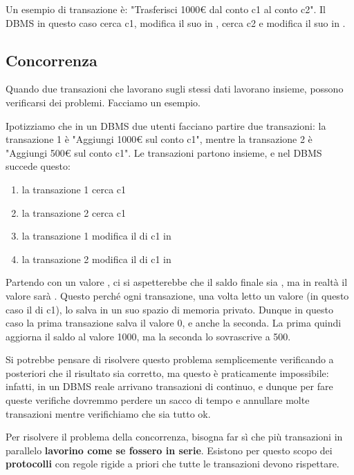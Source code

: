 \documentclass[11pt, a4paper, titlepage, oneside]{scrbook}
\begin{document}
Un esempio di transazione è: "Trasferisci 1000€ dal conto c1 al conto c2". Il DBMS in questo caso cerca c1, modifica il suo  in , cerca c2 e modifica il suo  in . 

\subsection{Concorrenza}

Quando due transazioni che lavorano sugli stessi dati lavorano insieme, possono verificarsi dei problemi. Facciamo un esempio.

Ipotizziamo che in un DBMS due utenti facciano partire due transazioni: la transazione 1 è "Aggiungi 1000€ sul conto c1", mentre la transazione 2 è "Aggiungi 500€ sul conto c1". Le transazioni partono insieme, e nel DBMS succede questo:
\begin{enumerate}[label=\arabic*°]
    \item la transazione 1 cerca c1
    \item la transazione 2 cerca c1
    \item la transazione 1 modifica il  di c1 in 
    \item la transazione 2 modifica il  di c1 in  
\end{enumerate}

Partendo con un valore , ci si aspetterebbe che il saldo finale sia , ma in realtà il valore sarà . Questo perché ogni transazione, una volta letto un valore (in questo caso il  di c1), lo salva in un suo spazio di memoria privato. Dunque in questo caso la prima transazione salva il valore 0, e anche la seconda. La prima quindi aggiorna il saldo al valore 1000, ma la seconda lo sovrascrive a 500.

Si potrebbe pensare di risolvere questo problema semplicemente verificando a posteriori che il risultato sia corretto, ma questo è praticamente impossibile: infatti, in un DBMS reale arrivano transazioni di continuo, e dunque per fare queste verifiche dovremmo perdere un sacco di tempo e annullare molte transazioni mentre verifichiamo che sia tutto ok.

\begin{Proposizione}
\label{propos-transazioni-concorrenti}
Per risolvere il problema della concorrenza, bisogna far sì che più transazioni in parallelo \textbf{lavorino come se fossero in serie}. 
Esistono per questo scopo dei \textbf{protocolli} con regole rigide a priori che tutte le transazioni devono rispettare.
\end{Proposizione}
 
\end{document}
